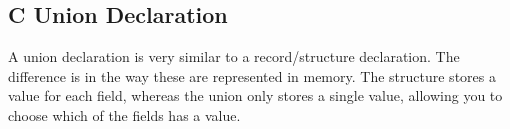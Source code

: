 \clearpage
\subsection{C Union Declaration} %
\label{sub:c_union_declaration}

A union declaration is very similar to a record/structure declaration. The difference is in the way these are represented in memory. The structure stores a value for each field, whereas the union only stores a single value, allowing you to choose which of the fields has a value.




